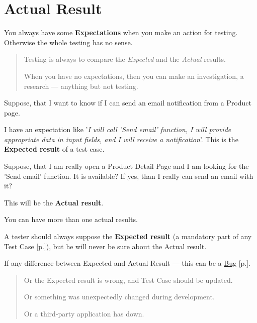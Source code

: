 \section{Actual Result}
\label{sec:Actual Result}

You always have some \textbf{Expectations} when you make an action for testing. Otherwise the whole testing has no sense.

\begin{quote}
Testing is always to compare the \emph{Expected} and the \emph{Actual} results.

When you have no expectations, then you can make an investigation, a research — anything but not testing.
\end{quote}

Suppose, that I want to know if I can send an email notification from a Product page.

I have an expectation like '\textit{I will call 'Send email' function, I will provide appropriate data in input fields, and I will receive a notification}'. This is the \textbf{Expected result} of a test case.

Suppose, that I am really open a Product Detail Page and I am looking for the 'Send email' function. It is available? If yes, than I really can send an email with it? 

This will be the \textbf{Actual result}.

You can have more than one actual results.

A tester should always suppose the \textbf{Expected result} (a mandatory part of any Test Case [p.\pageref{sec:Test Case}]), but he will never be sure about the Actual result.

If any difference between Expected and Actual Result — this can be a \hyperref[sec:Bug]{Bug} [p.\pageref{sec:Bug}].

\begin{quote}
Or the Expected result is wrong, and Test Case should be updated.

Or something was unexpectedly changed during development.

Or a third-party application has down.                                      \end{quote} 